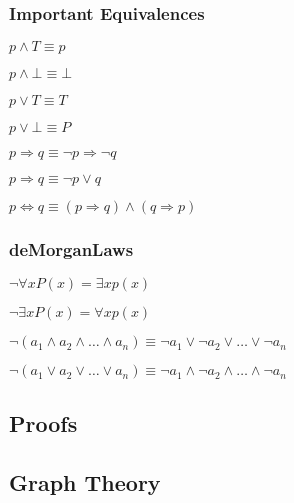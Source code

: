 \documentclass[5pt]{article}
\begin{document}
\begin{multicols}{2}
\begin{tabular}{lll}
\end{tabular}

\subsubsection{Important Equivalences}
\begin{itemize*}
    \item $p\land T\equiv p$
    \item $p\land\bot\equiv\bot$
    \item $p\lor T\equiv T$
    \item $p\lor\bot\equiv P$
    \item $p\Rightarrow q\equiv \lnot p\Rightarrow \lnot q$
    \item $p\Rightarrow q\equiv \lnot p \lor q$
    \item $p\Leftrightarrow q\equiv (p\Rightarrow q)\land(q\Rightarrow p)$
\end{itemize*}

\subsubsection{deMorganLaws}
\begin{itemize*}
    \item $\lnot\forall xP(x)=\exists xp(x)$
    \item $\lnot\exists xP(x)=\forall xp(x)$
    \item $\lnot(a_1\land a_2\land \dots\land a_n)\equiv \lnot a_1\lor \lnot a_2\lor \dots\lor \lnot a_n$
    \item $\lnot(a_1\lor a_2\lor \dots\lor a_n)\equiv \lnot a_1\land \lnot a_2\land \dots\land \lnot a_n$
\end{itemize*}


\subsection{Proofs}

\subsection{Graph Theory}



\end{multicols}
\end{document}
